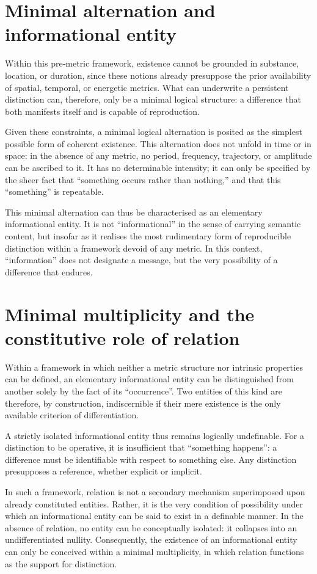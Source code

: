 \documentclass[11pt,a4paper]{article}
\begin{document}
\section{Minimal alternation and informational entity}
Within this pre‑metric framework, existence cannot be grounded in substance, location, or duration, since these notions already presuppose the prior availability of spatial, temporal, or energetic metrics. What can underwrite a persistent distinction can, therefore, only be a minimal logical structure: a difference that both manifests itself and is capable of reproduction.

Given these constraints, a minimal logical alternation is posited as the simplest possible form of coherent existence. This alternation does not unfold in time or in space: in the absence of any metric, no period, frequency, trajectory, or amplitude can be ascribed to it. It has no determinable intensity; it can only be specified by the sheer fact that “something occurs rather than nothing,” and that this “something” is repeatable.

This minimal alternation can thus be characterised as an elementary informational entity. It is not “informational” in the sense of carrying semantic content, but insofar as it realises the most rudimentary form of reproducible distinction within a framework devoid of any metric. In this context, “information” does not designate a message, but the very possibility of a difference that endures.

\section{Minimal multiplicity and the constitutive role of relation}

Within a framework in which neither a metric structure nor intrinsic properties can be defined, an elementary informational entity can be distinguished from another solely by the fact of its “occurrence”. Two entities of this kind are therefore, by construction, indiscernible if their mere existence is the only available criterion of differentiation.

A strictly isolated informational entity thus remains logically undefinable. For a distinction to be operative, it is insufficient that “something happens”: a difference must be identifiable with respect to something else. Any distinction presupposes a reference, whether explicit or implicit.

In such a framework, relation is not a secondary mechanism superimposed upon already constituted entities. Rather, it is the very condition of possibility under which an informational entity can be said to exist in a definable manner. In the absence of relation, no entity can be conceptually isolated: it collapses into an undifferentiated nullity. Consequently, the existence of an informational entity can only be conceived within a minimal multiplicity, in which relation functions as the support for distinction.
\end{document}
